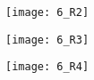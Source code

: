 \begin{QCM}
\begin{GroupeQCM}
\begin{exercice}
\begin{ChoixQCM}{4}
      \texttt{[image: 6\_R2]}
      \item 
      
      \texttt{[image: 6\_R3]}
      \item 
      
      \texttt{[image: 6\_R4]}
      \end{ChoixQCM}
\begin{corrige}
   \end{corrige}
    \end{exercice}
    \end{GroupeQCM}
\end{QCM}




  
